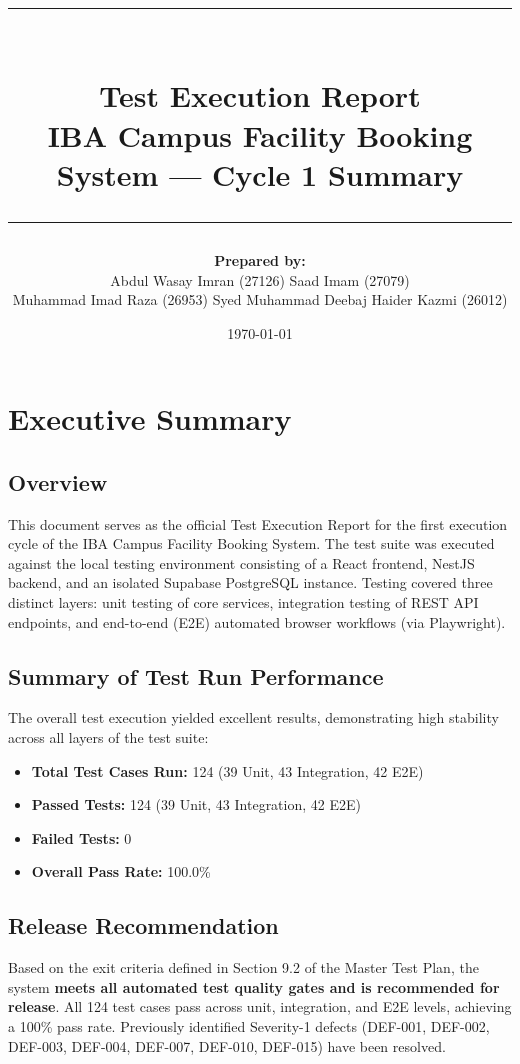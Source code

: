 \documentclass[11pt,a4paper]{article}
\title{
    \rule{\textwidth}{1.5pt} \\
    \textbf{\Large Test Execution Report} \\
    \large IBA Campus Facility Booking System --- Cycle 1 Summary \\
    \rule{\textwidth}{1.5pt}
}
\author{
    \textbf{Prepared by:} \\
    Abdul Wasay Imran (27126) \quad Saad Imam (27079) \\
    Muhammad Imad Raza (26953) \quad Syed Muhammad Deebaj Haider Kazmi (26012)
}
\date{\today}
\begin{document}
\maketitle
\newpage
\tableofcontents
\newpage

\section{Executive Summary}

\subsection{Overview}
This document serves as the official Test Execution Report for the first execution cycle of the IBA Campus Facility Booking System. The test suite was executed against the local testing environment consisting of a React frontend, NestJS backend, and an isolated Supabase PostgreSQL instance. Testing covered three distinct layers: unit testing of core services, integration testing of REST API endpoints, and end-to-end (E2E) automated browser workflows (via Playwright).

\subsection{Summary of Test Run Performance}
The overall test execution yielded excellent results, demonstrating high stability across all layers of the test suite:
\begin{itemize}[noitemsep,topsep=3pt]
    \item \textbf{Total Test Cases Run:} 124 (39 Unit, 43 Integration, 42 E2E)
    \item \textbf{Passed Tests:} 124 (39 Unit, 43 Integration, 42 E2E)
    \item \textbf{Failed Tests:} 0
    \item \textbf{Overall Pass Rate:} 100.0\%
\end{itemize}

\subsection{Release Recommendation}
Based on the exit criteria defined in Section 9.2 of the Master Test Plan, the system \textbf{meets all automated test quality gates and is recommended for release}. All 124 test cases pass across unit, integration, and E2E levels, achieving a 100\% pass rate. Previously identified Severity-1 defects (DEF-001, DEF-002, DEF-003, DEF-004, DEF-007, DEF-010, DEF-015) have been resolved.
\end{document}
